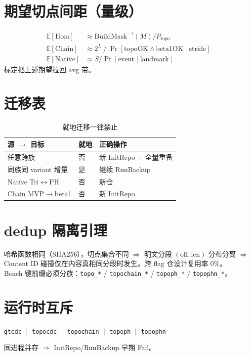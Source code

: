 \section{期望切点间距（量级）}

\begin{align}
\mathbb{E}[\mathrm{Hom}] &\approx \mathrm{BuildMask}^{-1}(M)/P_{\mathrm{topo}}\\
\mathbb{E}[\mathrm{Chain}] &\approx 2^{L}\ /\ \Pr[\mathrm{topoOK}\land\mathrm{beta1OK}\mid\mathrm{stride}]\\
\mathbb{E}[\mathrm{Native}] &\approx S/\Pr[\mathrm{event}\mid\mathrm{landmark}]
\end{align}
标定把上述期望拉回 $\mathrm{avg}$ 带。

\section{迁移表}

\begin{table}[htbp]
\centering
\caption{就地迁移一律禁止}
\label{tab:migrate}
\begin{tabular}{@{}lll@{}}
\toprule
源 $\to$ 目标 & 就地 & 正确操作 \\
\midrule
任意跨族 & 否 & 新 InitRepo + 全量重备 \\
同族同 variant 增量 & 是 & 继续 RunBackup \\
Native Tri$\leftrightarrow$PH & 否 & 新仓 \\
Chain MVP$\to$beta1 & 否 & 新 InitRepo \\
\bottomrule
\end{tabular}
\end{table}

\section{dedup 隔离引理}

\begin{structbox}[零跨族复用]
哈希函数相同（SHA256），切点集合不同 $\Rightarrow$ 明文分段 $(\mathrm{off},\mathrm{len})$ 分布分离 $\Rightarrow$ Content ID 碰撞仅在内容真相同分段时发生。跨 flag 仓设计复用率 0\%。\\
Bench 键前缀必须分族：\texttt{topo\_*} / \texttt{topochain\_*} / \texttt{topoph\_*} / \texttt{topophn\_*}。
\end{structbox}

\section{运行时互斥}

\begin{center}
\texttt{gtcdc} $\;|\;$ \texttt{topocdc} $\;|\;$ \texttt{topochain} $\;|\;$ \texttt{topoph} $\;|\;$ \texttt{topophn}
\end{center}
同进程并存 $\Rightarrow$ InitRepo/RunBackup 早期 Fail。
